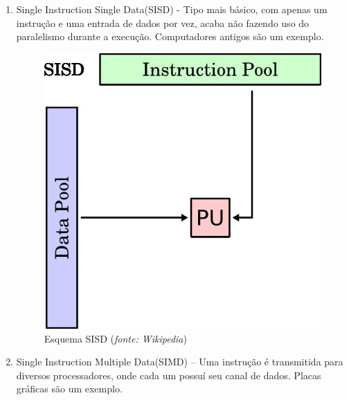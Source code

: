 \documentclass[a4paper]{article}
\begin{document}
\begin{enumerate}

\item {Single Instruction Single Data(SISD) - Tipo mais básico, com apenas um instrução e uma entrada de dados por vez, acaba não fazendo uso do paralelismo durante a execução. Computadores antigos são um exemplo.

\begin{figure}[h]
\centering
\includegraphics[scale=0.5]{SISD}
\caption{Esquema SISD (\textit{fonte: Wikipedia})}
\end{figure}
}

\item {Single Instruction Multiple Data(SIMD) – Uma instrução é transmitida para diversos processadores, onde cada um possuí seu canal de dados. Placas gráficas são um exemplo.

}
\end{enumerate}
\end{document}
